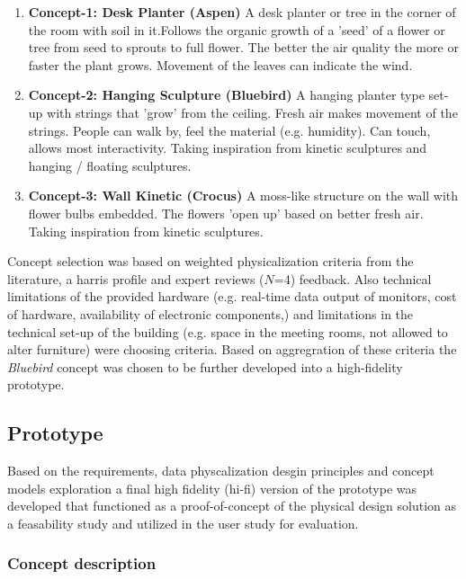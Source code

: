 \begin{enumerate}
  \item \textbf{Concept-1: Desk Planter (Aspen)}
      A desk planter or tree in the corner of the room with soil in it.Follows the organic growth of a 'seed' of a flower or tree from seed to sprouts to full flower. The better the air quality the more or faster the plant grows. Movement of the leaves can indicate the wind.

  \item \textbf{Concept-2: Hanging Sculpture (Bluebird)}
      A hanging planter type set-up with strings that 'grow' from the ceiling. Fresh air makes movement of the strings. People can walk by, feel the material (e.g. humidity). Can touch, allows most interactivity. Taking inspiration from kinetic sculptures and hanging / floating sculptures.

  \item \textbf{Concept-3: Wall Kinetic (Crocus)}
      A moss-like structure on the wall with flower bulbs embedded. The flowers 'open up' based on better fresh air. Taking inspiration from kinetic sculptures.
\end{enumerate}


Concept selection was based on weighted physicalization criteria from the literature, a harris profile  and expert reviews ($N$=4) feedback. Also technical limitations of the provided hardware (e.g. real-time data output of monitors, cost of hardware, availability of electronic components,) and limitations in the technical set-up of the building (e.g. space in the meeting rooms, not allowed to alter furniture) were choosing criteria. Based on aggregration of these criteria the \textit{Bluebird} concept was chosen to be further developed into a high-fidelity prototype.


\subsection{Prototype}

Based on the requirements, data physcalization desgin principles and concept models exploration a final high fidelity (hi-fi) version of the prototype was developed that functioned as a proof-of-concept of the physical design solution as a feasability study and utilized in the user study for evaluation.



\subsubsection{Concept description}

